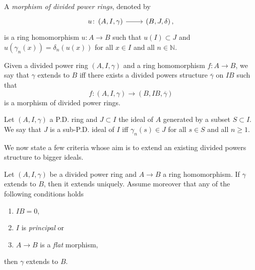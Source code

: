 \begin{defn}
	A {\em morphism of divided power rings}, denoted by
	\begin{equation*}
	\begin{tikzcd}[row sep = 0ex
		,/tikz/column 1/.append style={anchor=base east}
		,/tikz/column 2/.append style={anchor=base west}]
		u\colon \left(A, I, \gamma\right) 
		\arrow[r, "", rightarrow] &
		\left(B, J, \delta\right)
	,\end{tikzcd}
	\end{equation*} 
	is a ring homomorphism $u\colon A \to B$ such that
	$u(I) \subset J$ and $u(\gamma_n(x)) = \delta_n(u(x))$
	for all $x \in I$ and all $n \in \mathbb{N}$.
\end{defn}


\begin{defn}[]\label{RingExtendingDivPowers}
	Given a divided power ring $\left(A, I, \gamma\right)$ and
	a ring homomorphism $f\colon A \to B$, we say that
	$\gamma$ extends to $B$ iff there exists a divided powers
	structure $\overline{\gamma}$ on $IB$ such that
	\begin{equation*}
		f\colon \left(A, I, \gamma\right) \to \left(B, IB, \overline{\gamma}\right)
	\end{equation*}
	is a morphism of divided power rings.
\end{defn}


\begin{defn}
	Let $\left(A, I, \gamma\right)$ a P.D. ring and $J \subset I$
	the ideal of $A$ generated by a subset $S \subset I$.
	We say that $J$ is a sub-P.D. ideal of $I$
	iff $\gamma_n(s) \in J$ for all $s \in S$
	and all $n \geq 1$.
\end{defn}


\noindent
We now state a few criteria whose aim is to extend an existing divided powers structure
to bigger ideals.
\begin{lem}
\label{lem:PDFlatExtension}
	Let $\left(A, I, \gamma\right)$ be a divided power ring
	and $A \to B$ a ring homomorphism.
	If $\gamma$ extends to $B$, then it extends uniquely.
	Assume moreover that any of the following conditions holds
\begin{enumerate}
	\item $IB = 0$,
	\item $I$ is {\em principal} or
	\item $A \to B$ is a {\em flat} morphism,
\end{enumerate}
	then $\gamma$ extends to $B$.
\end{lem} 


